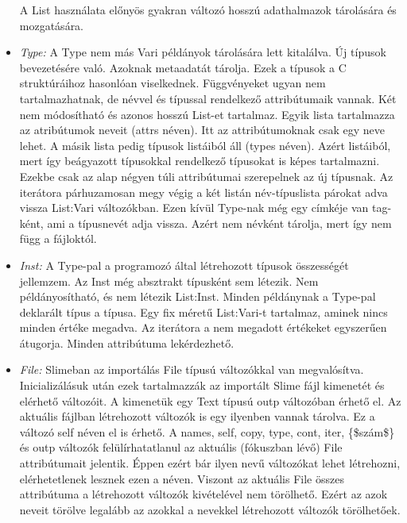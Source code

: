 \begin{itemize}
A List használata előnyös gyakran változó hosszú adathalmazok tárolására és mozgatására.
\item \emph{Type:} 
A Type nem más Vari példányok tárolására lett kitalálva.
Új típusok bevezetésére való.
Azoknak metaadatát tárolja.
Ezek a típusok a C struktúráihoz hasonlóan viselkednek.
Függvényeket ugyan nem tartalmazhatnak, de névvel és típussal rendelkező attribútumaik vannak.
Két nem módosítható és azonos hosszú List-et tartalmaz.
Egyik lista tartalmazza az atribútumok neveit (attrs néven).
Itt az attribútumoknak csak egy neve lehet.
A másik lista pedig típusok listáiból áll (types néven).
Azért listáiból, mert így beágyazott típusokkal rendelkező típusokat is képes tartalmazni. 
Ezekbe csak az alap négyen túli attribútumai szerepelnek az új típusnak.
Az iterátora párhuzamosan megy végig a két listán név-típuslista párokat adva vissza List:Vari változókban.
Ezen kívül Type-nak még egy címkéje van tag-ként, ami a típusnevét adja vissza.
Azért nem névként tárolja, mert így nem függ a fájloktól.
\item \emph{Inst:} 
A Type-pal a programozó által létrehozott típusok összességét jellemzem.
Az Inst még absztrakt típusként sem létezik.
Nem példányosítható, és nem létezik List:Inst.
Minden példánynak a Type-pal deklarált típus a típusa.
Egy fix méretű List:Vari-t tartalmaz, aminek nincs minden értéke megadva.
Az iterátora a nem megadott értékeket egyszerűen átugorja.
Minden attribútuma lekérdezhető.
\item \emph{File:} 
Slimeban az importálás File típusú változókkal van megvalósítva.
Inicializálásuk után ezek tartalmazzák az importált Slime fájl kimenetét és elérhető változóit.
A kimenetük egy Text típusú outp változóban érhető el.
Az aktuális fájlban létrehozott változók is egy ilyenben vannak tárolva.
Ez a változó self néven el is érhető. 
A names, self, copy, type, cont, iter, \{\$szám\$\} és outp változók felülírhatatlanul az aktuális (fókuszban lévő) File attribútumait jelentik.
Éppen ezért bár ilyen nevű változókat lehet létrehozni, elérhetetlenek lesznek ezen a néven. 
Viszont az aktuális File összes attribútuma a létrehozott változók kivételével nem törölhető.
Ezért az azok neveit törölve legalább az azokkal a nevekkel létrehozott változók törölhetőek.
\end{itemize}


